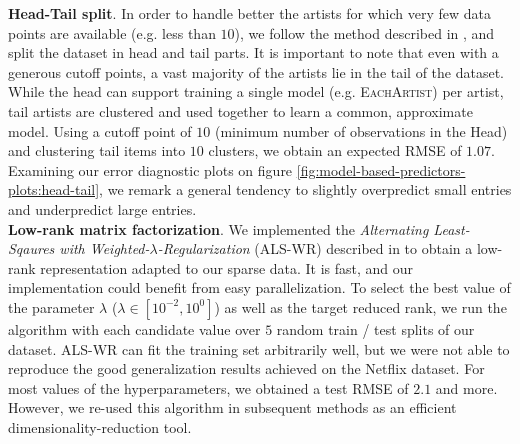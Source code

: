 \documentclass[10pt,a4paper]{article}
\begin{document}
    \noindent
    \textbf{Head-Tail split}. In order to handle better the artists for which very few data points are available (e.g. less than $10$), we follow the method described in \cite{long-tail-recommender}, and split the dataset in head and tail parts. It is important to note that even with a generous cutoff points, a vast majority of the artists lie in the tail of the dataset. While the head can support training a single model (e.g. \textsc{EachArtist}) per artist, tail artists are clustered and used together to learn a common, approximate model. Using a cutoff point of $10$ (minimum number of observations in the Head) and clustering tail items into $10$ clusters, we obtain an expected RMSE of $1.07$. Examining our error diagnostic plots on figure \ref{fig:model-based-predictors-plots:head-tail}, we remark a general tendency to slightly overpredict small entries and underpredict large entries.\\

    \noindent
    \textbf{Low-rank matrix factorization}. We implemented the \textit{Alternating Least-Sqaures with Weighted-$\lambda$-Regularization} (ALS-WR) described in \cite{alswr} to obtain a low-rank representation adapted to our sparse data. It is fast, and our implementation could benefit from easy parallelization. To select the best value of the parameter $\lambda$ ($\lambda \in [10^{-2},10^0]$) as well as the target reduced rank, we run the algorithm with each candidate value over $5$ random train / test splits of our dataset. ALS-WR can fit the training set arbitrarily well, but we were not able to reproduce the good generalization results achieved \cite{alswr} on the Netflix dataset. For most values of the hyperparameters, we obtained a test RMSE of $2.1$ and more. However, we re-used this algorithm in subsequent methods as an efficient dimensionality-reduction tool.
\end{document}
